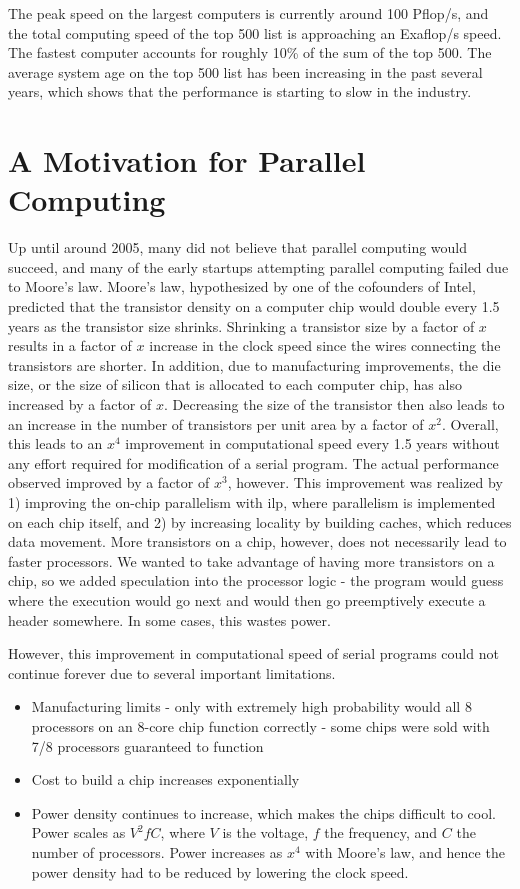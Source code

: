 \documentclass[10pt]{article}
\begin{document}
\begin{flushleft}
The peak speed on the largest computers is currently around 100 Pflop/s, and the total computing speed of the top 500 list is approaching an Exaflop/s speed. The fastest computer accounts for roughly 10\% of the sum of the top 500. The average system age on the top 500 list has been increasing in the past several years, which shows that the performance is starting to slow in the industry.

\section{A Motivation for Parallel Computing}

Up until around 2005, many did not believe that parallel computing would succeed, and many of the early startups attempting parallel computing failed due to Moore's law. Moore's law, hypothesized by one of the cofounders of Intel, predicted that the transistor density on a computer chip would double every 1.5 years as the transistor size shrinks. Shrinking a transistor size by a factor of \(x\) results in a factor of \(x\) increase in the clock speed since the wires connecting the transistors are shorter. In addition, due to manufacturing improvements, the die size, or the size of silicon that is allocated to each computer chip, has also increased by a factor of \(x\). Decreasing the size of the transistor then also leads to an increase in the number of transistors per unit area by a factor of \(x^2\). Overall, this leads to an \(x^4\) improvement in computational speed every 1.5 years without any effort required for modification of a serial program. The actual performance observed improved by a factor of \(x^3\), however. This improvement was realized by 1) improving the on-chip parallelism with \gls{ilp}, where parallelism is implemented on each chip itself, and 2) by increasing locality by building caches, which reduces data movement. More transistors on a chip, however, does not necessarily lead to faster processors. We wanted to take advantage of having more transistors on a chip, so we added speculation into the processor logic - the program would guess where the execution would go next and would then go preemptively execute a header somewhere. In some cases, this wastes power.

However, this improvement in computational speed of serial programs could not continue forever due to several important limitations.

\begin{itemize}
\item Manufacturing limits - only with extremely high probability would all 8 processors on an 8-core chip function correctly - some chips were sold with 7/8 processors guaranteed to function
\item Cost to build a chip increases exponentially
\item Power density continues to increase, which makes the chips difficult to cool. Power scales as \(V^2fC\), where \(V\) is the voltage, \(f\) the frequency, and \(C\) the number of processors. Power increases as \(x^4\) with Moore's law, and hence the power density had to be reduced by lowering the clock speed.
\end{itemize}


\end{flushleft}
\end{document}
